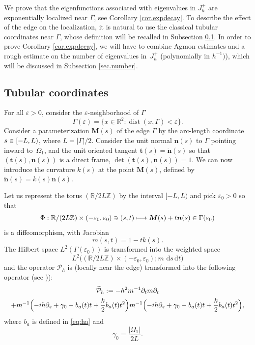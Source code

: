 \documentclass[JEP,XML,SOM,Unicode,NoFloatCountersInSection,published]{cedram}
\newcommand\mto{\mathchoice{\longmapsto}{\mapsto}{\mapsto}{\mapsto}}
\let\sep:
\let\epsilon\varepsilon
\newcommand{\rd}{\,\mathrm{d}}
\DeclareMathOperator{\dist}{dist}
\newcommand{\cP}{\mathcal{P}}
\newcommand{\bn}{\boldsymbol{n}}
\newcommand{\bt}{\boldsymbol{t}}
\newcommand{\bM}{\boldsymbol{M}}
\theoremstyle{plain}
\theoremstyle{definition}
\begin{document}
We prove that the eigenfunctions associated with eigenvalues in $J^+_h$ are exponentially localized near $\Gamma$, see Corollary \ref{cor.expdecay}. To describe the effect of the edge on the localization, it is natural to use the classical tubular coordinates near $\Gamma$, whose definition will be recalled in Subsection \ref{sec.tubular}. In order to prove Corollary \ref{cor.expdecay},
we will have to combine Agmon estimates and a rough estimate on the number of eigenvalues in~$J^+_h$ (polynomially in $h^{-1})$), which will be discussed in Subsection \ref{sec.number}.

\subsection{Tubular coordinates}\label{sec.tubular}
For all $\epsilon>0$, consider the $\epsilon$-neighborhood of $\Gamma$
\begin{equation}\label{eq:gam-ep}
\Gamma(\epsilon)=\{x\in\mathbb R^2\sep \dist(x,\Gamma)<\epsilon\}.
\end{equation}
Consider a parameterization $\bM(s)$ of the edge $\Gamma$ by the arc-length coordinate $s\in\nobreak[-L,L)$, where $L=|\Gamma|/2$. Consider the unit normal $\bn(s)$ to $\Gamma$ pointing inward to~$\Omega_1$, and the unit oriented tangent $\bt(s)=\dot{\bn}(s)$ so that $(\bt(s),\bn(s))$ is a direct frame, \ie $\det(\bt(s),\bn(s))=1$. We can now introduce the curvature $k(s)$ at the point $\bM(s)$, defined by $\ddot{\bn}(s)=k(s)\bn(s)$.

Let us represent the torus $(\mathbb R/ 2L \mathbb Z)$ by the interval $[-L,L)$ and pick $\epsilon_0>0$ so that
\[
\Phi: \mathbb R/ (2L \mathbb Z)\times (-\epsilon_0,\epsilon_0)\ni (s,t)\mto \bM(s)+t\bn(s)\in\Gamma(\epsilon_0)
\]
is a diffeomorphism, with Jacobian
\begin{equation}\label{defm}m(s,t)=1-tk(s).
\end{equation}
The Hilbert space $L^2(\Gamma(\epsilon_0))$ is transformed into the weighted space
\[
L^2\bigl((\mathbb R/ 2L \mathbb Z) \times(-\epsilon_0,\epsilon_0);m\,\rd s\rd t\bigr)
\] and the operator $\cP_h$ is (locally near the edge) transformed into the following operator (see \cite[App.\,F]{FH10})):
\begin{multline*}
\widetilde{\cP}_h:=-h^2m^{-1}\partial_t m\partial_t\\+m^{-1}\Bigl(-ih\partial_s+\gamma_0-b_a(t)t+\frac{k}{2}b_a(t)t^2\Bigr)m^{-1}\Bigl(-ih\partial_s+\gamma_0-b_a(t)t+\frac{k}{2}b_a(t)t^2\Bigr),
\end{multline*}
where $b_a$ is defined in \eqref{eq:ha} and
\begin{equation}\label{eq:circ}
\gamma_0=\frac{|\Omega_1|}{2L}.
\end{equation}
\end{document}

